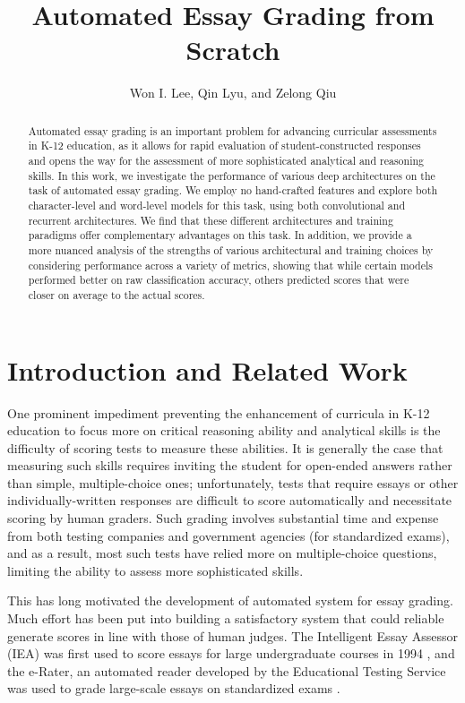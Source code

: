 \documentclass[10pt,psamsfonts]{amsart}
\title{Automated Essay Grading from Scratch}
\author{Won I. Lee, Qin Lyu, and Zelong Qiu}
\theoremstyle{definition}
\theoremstyle{remark}
\numberwithin{equation}{section}
\begin{document}
	
\maketitle

\begin{abstract}
	Automated essay grading is an important problem for advancing curricular assessments in K-12 education, as it allows for rapid evaluation of student-constructed responses and opens the way for the assessment of more sophisticated analytical and reasoning skills.  In this work, we investigate the performance of various deep architectures on the task of automated essay grading. We employ no hand-crafted features and explore both character-level and word-level models for this task, using both convolutional and recurrent architectures. We find that these different architectures and training paradigms offer complementary advantages on this task. In addition, we provide a more nuanced analysis of the strengths of various architectural and training choices by considering performance across a variety of metrics, showing that while certain models performed better on raw classification accuracy, others predicted scores that were closer on average to the actual scores.
\end{abstract}

\section*{Introduction and Related Work}

One prominent impediment preventing the enhancement of curricula in K-12 education to focus more on critical reasoning ability and analytical skills is the difficulty of scoring tests to measure these abilities. It is generally the case that measuring such skills requires inviting the student for open-ended answers rather than simple, multiple-choice ones; unfortunately, tests that require essays or other individually-written responses are difficult to score automatically and necessitate scoring by human graders. Such grading involves substantial time and expense from both testing companies and government agencies (for standardized exams), and as a result, most such tests have relied more on multiple-choice questions, limiting the ability to assess more sophisticated skills.

This has long motivated the development of automated system for essay grading. Much effort has been put into building a satisfactory system that could reliable generate scores in line with those of human judges. The Intelligent Essay Assessor (IEA) was first used to score essays for large undergraduate courses in 1994 \cite{iea}, and the e-Rater, an automated reader developed by the Educational Testing Service was used to grade large-scale essays on standardized exams \cite{erater}.
\end{document}
